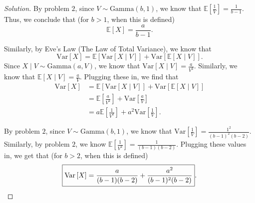 \documentclass[11pt]{article}
\newenvironment{solution}
  {\renewcommand\qedsymbol{$\blacksquare$}\begin{proof}[Solution]}
  {\end{proof}}
\begin{document}
\begin{enumerate}
\begin{enumerate}[a)]
\begin{solution}
		By problem $2$, since $V \sim \mathrm{Gamma}(b, 1)$, we know that $\mathbb{E}\left[\frac{1}{V} \right] = \frac{1}{b-1}$. Thus, we conclude that (for $b > 1$, when this is defined)
		\[
			\boxed{\mathbb{E}\left[X \right] = \frac{a}{b-1}}.
		\]

		Similarly, by Eve's Law (The Law of Total Variance), we know that
		\[
			\mathrm{Var} \left[X \right] = \mathbb{E}\left[\mathrm{Var} \left[ X \mid V \right]  \right] + \mathrm{Var} \left[\mathbb{E}\left[X \mid V \right]  \right]. 
		\]
		Since $X \mid V \sim \mathrm{Gamma}(a, V)$, we know that $\mathrm{Var} \left[X \mid V \right] = \frac{a}{V^2}$. Similarly, we know that $\mathbb{E}\left[X \mid V \right] = \frac{a}{V}$. 
		Plugging these in, we find that 
		\begin{align*}
			\mathrm{Var} \left[X \right] &= \mathbb{E}\left[\mathrm{Var} \left[ X \mid V \right]  \right] + \mathrm{Var} \left[\mathbb{E}\left[X \mid V \right]  \right] \\
			&= \mathbb{E}\left[\frac{a}{V^2} \right] + \mathrm{Var} \left[ \frac{a}{V} \right] \\
			&= a\mathbb{E}\left[\frac{1}{V^2} \right] + a^2 \mathrm{Var} \left[ \frac{1}{V} \right].
		\end{align*}

		By problem $2$, since $V \sim \mathrm{Gamma}(b, 1)$, we know that $\mathrm{Var} \left[\frac{1}{V} \right] = \frac{1^2}{(b-1)^2(b-2)}$. Similarly, by problem $2$, we know
		$\mathbb{E}\left[\frac{1}{V^2} \right] = \frac{1}{(b-1)(b-2)}.$ Plugging these values in, we get that (for $b > 2$, when this is defined)
		\[
			\boxed{\mathrm{Var} \left[X \right] = \frac{a}{(b-1)(b-2)} + \frac{a^2}{(b-1)^2(b-2)}}. \qedhere
		\]
		\end{solution}
	\end{enumerate}
\end{enumerate}
\end{document}
